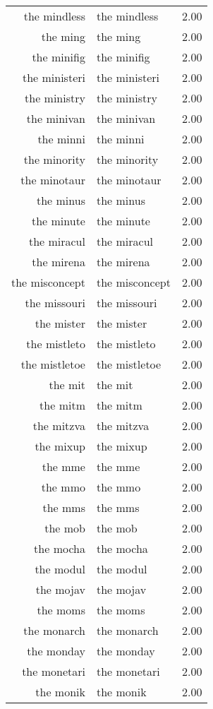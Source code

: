 \begin{table}[ht]
\begin{tabular}{rlr}
  the mindless & the mindless & 2.00 \\ 
  the ming & the ming & 2.00 \\ 
  the minifig & the minifig & 2.00 \\ 
  the ministeri & the ministeri & 2.00 \\ 
  the ministry & the ministry & 2.00 \\ 
  the minivan & the minivan & 2.00 \\ 
  the minni & the minni & 2.00 \\ 
  the minority & the minority & 2.00 \\ 
  the minotaur & the minotaur & 2.00 \\ 
  the minus & the minus & 2.00 \\ 
  the minute & the minute & 2.00 \\ 
  the miracul & the miracul & 2.00 \\ 
  the mirena & the mirena & 2.00 \\ 
  the misconcept & the misconcept & 2.00 \\ 
  the missouri & the missouri & 2.00 \\ 
  the mister & the mister & 2.00 \\ 
  the mistleto & the mistleto & 2.00 \\ 
  the mistletoe & the mistletoe & 2.00 \\ 
  the mit & the mit & 2.00 \\ 
  the mitm & the mitm & 2.00 \\ 
  the mitzva & the mitzva & 2.00 \\ 
  the mixup & the mixup & 2.00 \\ 
  the mme & the mme & 2.00 \\ 
  the mmo & the mmo & 2.00 \\ 
  the mms & the mms & 2.00 \\ 
  the mob & the mob & 2.00 \\ 
  the mocha & the mocha & 2.00 \\ 
  the modul & the modul & 2.00 \\ 
  the mojav & the mojav & 2.00 \\ 
  the moms & the moms & 2.00 \\ 
  the monarch & the monarch & 2.00 \\ 
  the monday & the monday & 2.00 \\ 
  the monetari & the monetari & 2.00 \\ 
  the monik & the monik & 2.00 \\ 

\end{tabular}
\end{table}
